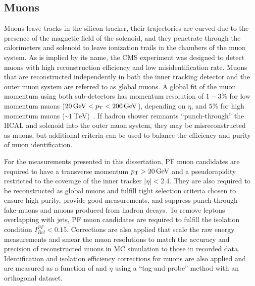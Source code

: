 \subsection{Muons}
\label{PF_Reconstruction_Muons}
Muons leave tracks in the silicon tracker, their trajectories are curved due to the presence of the magnetic field of the solenoid, and they penetrate through the calorimeters and solenoid to leave ionization trails in the chambers of the muon system.
As is implied by its name, the CMS experiment was designed to detect muons with high reconstruction efficiency and low misidentification rate.
Muons that are reconstructed independently in both the inner tracking detector and the outer muon system are referred to as global muons.
A global fit of the muon momentum using both sub-detectors has momentum resolution of $1-3\%$ for low momentum muons ($\SI{20}{\GeV} < \pT < \SI{200}{\GeV}$), depending on $\eta$, and $5\%$ for high momentum muons (\sim$\SI{1}{\TeV}$)~\cite{Chatrchyan:1129810}.
If hadron shower remnants ``punch-through'' the HCAL and solenoid into the outer muon system, they may be misreconstructed as muons, but additional criteria can be used to balance the efficiency and purity of muon identification.

For the measurements presented in this dissertation, PF muon candidates are required to have a transverse momentum $\pT > \SI{20}{\GeV}$ and a pseudorapidity restricted to the coverage of the inner tracker $\vert \eta \vert < 2.4$.
They are also required to be reconstructed as global muons and fulfill tight selection criteria chosen to ensure high purity, provide good \pT measurements, and suppress punch-through fake-muons and muons produced from hadron decays.
To remove leptons overlapping with jets, PF muon candidates are required to fulfill the isolation condition $I^{PF}_{Rel}< 0.15$.
Corrections are also applied that scale the raw energy measurements and smear the muon resolutions to match the accuracy and precision of reconstructed muons in MC simulation to those in recorded data.
Identification and isolation efficiency corrections for muons are also applied and are measured as a function of \pT and $\eta$ using a ``tag-and-probe'' method with an orthogonal dataset.

